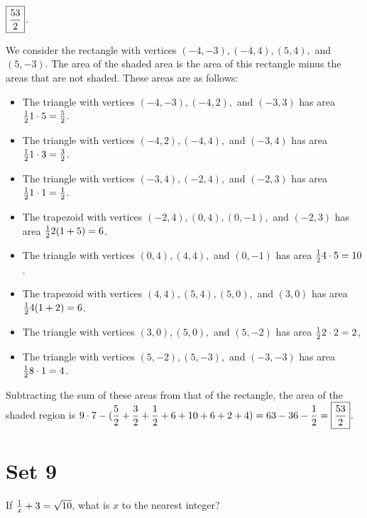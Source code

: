 \documentclass[11pt]{article}
\DeclareRobustCommand{\frac}[3][0pt]{%
  {\begingroup\hspace{#1}#2\hspace{#1}\endgroup\over\hspace{#1}#3\hspace{#1}}}
\begin{document}
\begin{answer} $\boxed{\displaystyle \frac{53}{2}}$. \end{answer}
\begin{solution}
We consider the rectangle with vertices $(-4, -3), (-4, 4), (5, 4),$ and $(5, -3)$. The area of the shaded area is the area of this rectangle minus the areas that are not shaded. These areas are as follows:
\begin{itemize}
	\item The triangle with vertices $(-4, -3), (-4, 2),$ and $(-3, 3)$ has area $\frac{1}{2} 1 \cdot 5 = \frac{5}{2}$.
	\item The triangle with vertices $(-4, 2), (-4, 4),$ and $(-3, 4)$ has area $\frac{1}{2} 1 \cdot 3 = \frac{3}{2}$.
	\item The triangle with vertices $(-3, 4), (-2, 4),$ and $(-2, 3)$ has area $\frac{1}{2} 1 \cdot 1 = \frac{1}{2}$.
	\item The trapezoid with vertices $(-2, 4), (0, 4), (0, -1),$ and $(-2, 3)$ has area $\frac{1}{2} 2(1 + 5) = 6$.
	\item The triangle with vertices $(0, 4), (4, 4),$ and $(0, -1)$ has area $\frac{1}{2} 4 \cdot 5 = 10$.
	\item The trapezoid with vertices $(4, 4), (5, 4), (5, 0),$ and $(3, 0)$ has area $\frac{1}{2} 	4(1+2) = 6$.
	\item The triangle with vertices $(3, 0), (5, 0),$ and $(5, -2)$ has area $\frac{1}{2} 2 \cdot 2 = 2$,
	\item The triangle with vertices $(5, -2), (5, -3),$ and $(-3, -3)$ has area $\frac{1}{2} 8 \cdot 1 = 4$.
\end{itemize}
Subtracting the sum of these areas from that of the rectangle, the area of the shaded region is $\displaystyle 9 \cdot 7 - (\frac{5}{2} + \frac{3}{2} + \frac{1}{2} + 6 + 10 + 6 + 2 + 4) = 63 - 36 - \frac{1}{2} =\boxed{\frac{53}{2}}$.
\end{solution}

\eject

\section*{Set 9}

\begin{problem}If $\frac{1}{x} + 3 = \sqrt{10}$, what is $x$ to the nearest integer?
\end{problem}
\end{document}
